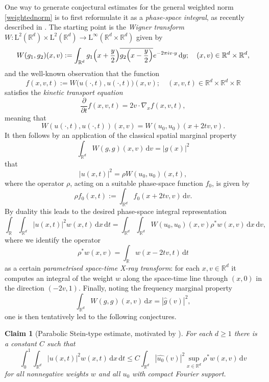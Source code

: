 \documentclass[10pt,a4paper]{amsart}
\newtheorem*{claim}{Claim}
\numberwithin{equation}{section}
\newcommand{\dd}{\,\mathrm{d}}
\renewcommand{\le}{\leqslant}
\renewcommand{\geq}{\geqslant}
\begin{document}
One way to generate conjectural estimates for the general weighted norm \eqref{weightednorm} is to first reformulate it as a \textit{phase-space integral}, as recently described in \cite{DMV, BGNO}. The starting point is the \emph{Wigner transform} $W\colon \mathrm{L}^2(\mathbb{R}^d)\times \mathrm{L}^2(\mathbb{R}^d)\rightarrow \mathrm{L}^\infty(\mathbb{R}^d\times\mathbb{R}^d)$ given by
\begin{equation}\label{eucwig}
W(g_1,g_2)(x,v):=\int_{\mathbb{R}^d}g_1\Bigl(x+\frac{y}{2}\Bigr)\overline{g_2\Bigl(x-\frac{y}{2}\Bigr)} e^{-2\pi i v\cdot y}\dd y; \quad (x,v)\in\mathbb{R}^d\times\mathbb{R}^d,
\end{equation} 
and the well-known observation \cite{Wigner} that the function 
\[ f(x,v,t) := W\bigl(u(\cdot,t), u(\cdot,t)\bigr)(x,v); \quad (x,v,t)\in\mathbb{R}^d\times\mathbb{R}^d\times\mathbb{R} \]
satisfies the \emph{kinetic transport equation} 
\begin{equation}\label{kineuc}
\frac{\partial}{\partial t}f(x,v,t) = 2v\cdot\nabla_x f(x,v,t),
\end{equation}
meaning that 
\[ W(u(\cdot,t), u(\cdot,t))(x,v)=W(u_0,u_0)(x+2tv,v). \]
It then follows by an application of the classical spatial marginal property
\[ \int_{\mathbb{R}^d}W(g,g)(x,v)\dd v=|g(x)|^2 \]
that
\begin{equation}\label{PSrepcont}
|u(x,t)|^2=\rho W(u_0,u_0)(x,t),
\end{equation}
where the operator $\rho$, acting on a suitable phase-space function $f_0$, is given by
\[ \rho f_0(x,t):=\int_{\mathbb{R}^d}f_0(x+2tv,v)\dd v. \]
By duality this leads to the desired phase-space integral representation
\[ \int_{\mathbb{R}}\int_{\mathbb{R}^d}|u(x,t)|^2w(x,t)\dd x\dd t=\int_{\mathbb{R}^d}\int_{\mathbb{R}^d}W(u_0,u_0)(x,v)\rho^{\ast}w(x,v)\dd x\dd v, \]
where we identify
the operator 
\[ \rho^{\ast}w(x,v)=\int_{\mathbb{R}}w(x-2tv,t)\dd t \]
as a certain \emph{parametrised space-time X-ray transform}: for each $x,v\in\mathbb{R}^d$ it computes an integral of the weight $w$ along the space-time line through $(x,0)$ in the direction $(-2v,1)$.
Finally, noting the frequency marginal property 
\[ \int_{\mathbb{R}^d}W(g,g)(x,v)\dd x=|\widehat{g}(v)|^2, \]
one is then tentatively led to the following conjectures.

\begin{claim}[{Parabolic Stein-type estimate, motivated by \cite{SteinProb}}]
For each $d\geq1$ there is a constant $C$ such that
\begin{equation}\label{eq:euc-Stein}
\int_0^1\int_{\mathbb{R}^d}|u(x,t)|^2w(x,t)\dd x\dd t
\le C\int_{\mathbb{R}^d}|\widehat{u_0}(v)|^2\sup_{x\in\mathbb{R}^d}\rho^{\ast}w(x,v)\dd v
\end{equation}
for all nonnegative weights $w$ and all $u_0$ with compact Fourier support.
\end{claim}
\end{document}
